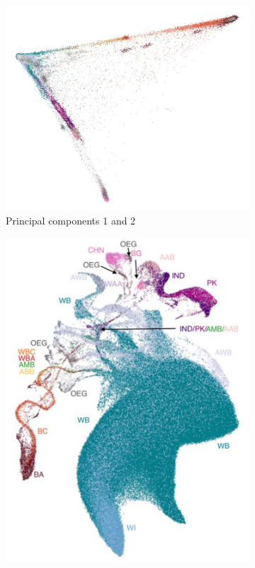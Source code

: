\documentclass[12pt]{pnas-new}
\begin{document}
\begin{figure}%
\centering
\begin{subfigure}{.5\columnwidth}
\includegraphics[width=\columnwidth]{images/UKBB_PC0_PC1_eth_crop.pdf}%
\caption{Principal components 1 and 2}%
\label{fig:pc_ukbb}%
\end{subfigure}\hfill%
\begin{subfigure}{.5\columnwidth}
\includegraphics[width=\columnwidth]{images/UKBB_UMAP_PC10_NN15_MD05_eth_labels.pdf}%

\end{subfigure}
\end{figure}
\end{document}
